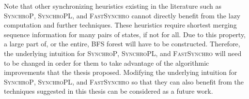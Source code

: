 \documentclass[12pt]{article}
\begin{document}
Note that other synchronizing heuristics existing in the literature such as \textsc{SynchroP}, \textsc{SynchroPL}, and \textsc{FastSynchro} cannot directly benefit from the lazy computation and further techniques. These heuristics require shortest merging sequence information for many pairs of states, if not for all. Due to this property, a large part of, or the entire, BFS forest will have to be constructed. Therefore, the underlying intuition for  \textsc{SynchroP}, \textsc{SynchroPL}, and \textsc{FastSynchro} will need to be changed in order for them to take advantage of the algorithmic improvements that the thesis proposed. Modifying the underlying intuition for \textsc{SynchroP}, \textsc{SynchroPL}, and \textsc{FastSynchro} so that they can also benefit from the techniques suggested in this thesis can be considered as a future work.

\clearpage


\end{document}
